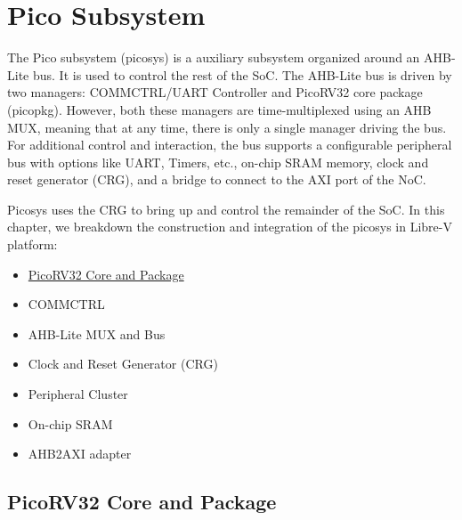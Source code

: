 \chapter{Pico Subsystem}\label{ch:hw-pico-sys}

The Pico subsystem (picosys) is a auxiliary subsystem organized around an AHB-Lite bus. It is used to control the rest of the SoC. The AHB-Lite bus is driven by two managers: COMMCTRL/UART Controller and PicoRV32 core package (picopkg). However, both these managers are time-multiplexed using an AHB MUX, meaning that at any time, there is only a single manager driving the bus. For additional control and interaction, the bus supports a configurable peripheral bus with options like UART, Timers, etc., on-chip SRAM memory, clock and reset generator (CRG), and a bridge to connect to the AXI port of the NoC. 

Picosys uses the CRG to bring up and control the remainder of the SoC. In this chapter, we breakdown the construction and integration of the picosys in Libre-V platform:
\begin{itemize}
  \item \hyperref[sec:hw-picorv32-pkg]{PicoRV32 Core and Package} 
  \item COMMCTRL 
  \item AHB-Lite MUX and Bus
  \item Clock and Reset Generator (CRG)
  \item Peripheral Cluster
  \item On-chip SRAM 
  \item AHB2AXI adapter 
\end{itemize}

\section{PicoRV32 Core and Package}\label{sec:hw-picorv32-pkg}



\newpage
